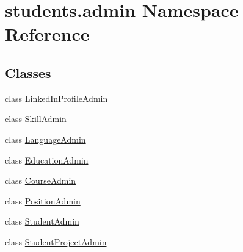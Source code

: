 \hypertarget{namespacestudents_1_1admin}{\section{students.\-admin Namespace Reference}
\label{namespacestudents_1_1admin}
}
\subsection*{Classes}
\begin{DoxyCompactItemize}
\item 
class \hyperlink{classstudents_1_1admin_1_1_linked_in_profile_admin}{Linked\-In\-Profile\-Admin}
\item 
class \hyperlink{classstudents_1_1admin_1_1_skill_admin}{Skill\-Admin}
\item 
class \hyperlink{classstudents_1_1admin_1_1_language_admin}{Language\-Admin}
\item 
class \hyperlink{classstudents_1_1admin_1_1_education_admin}{Education\-Admin}
\item 
class \hyperlink{classstudents_1_1admin_1_1_course_admin}{Course\-Admin}
\item 
class \hyperlink{classstudents_1_1admin_1_1_position_admin}{Position\-Admin}
\item 
class \hyperlink{classstudents_1_1admin_1_1_student_admin}{Student\-Admin}
\item 
class \hyperlink{classstudents_1_1admin_1_1_student_project_admin}{Student\-Project\-Admin}
\end{DoxyCompactItemize}
